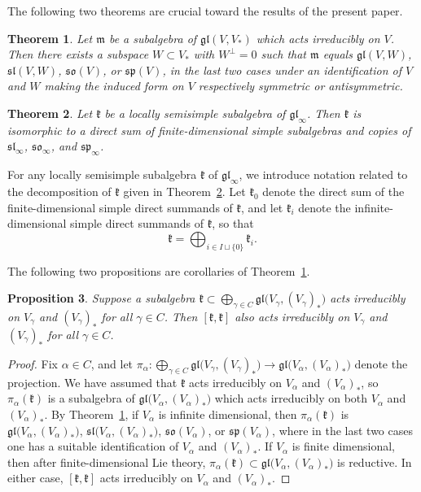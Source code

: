 \documentclass{article}
\def\gl{\mathfrak {gl}}
\def\m{\mathfrak {m}}
\def\sl{\mathfrak{sl}}
\def\so{\mathfrak{so}}
\def\sp{\mathfrak{sp}}
\def\k{\mathfrak{k}}
\newtheorem{thm}{Theorem}[section]
\newtheorem{prop}[thm]{Proposition}
\begin{document}
The following two theorems are crucial toward the results of the present paper. 


\begin{thm} \cite[Theorem 1.3]{BS} \label{irreducible}
Let $\m$ be a subalgebra of $\gl(V,V_*)$ which acts irreducibly on $V$.  Then there exists a subspace $W \subset V_*$ with $W^\perp = 0$ such that $\m$ equals $\gl(V,W)$, $\sl(V,W)$,
$\so(V)$, or $\sp(V)$, in the last two cases under an identification of $V$ and $W$ making the induced form on $V$ respectively symmetric or antisymmetric.
\end{thm}


\begin{thm} \cite{DP4} \label{locsemisimple} 
Let $\k$ be a locally semisimple subalgebra of $\gl_\infty$. 
Then $\k$ is isomorphic to a direct sum of finite-dimensional simple subalgebras and copies of $\sl_\infty$, $\so_\infty$, and $\sp_\infty$.
\end{thm}


For any locally semisimple subalgebra $\k$ of $\gl_\infty$, we introduce notation related to the decomposition of $\k$ given in Theorem~\ref{locsemisimple}.  Let $\k_0$ denote the direct sum of the finite-dimensional simple direct summands of $\k$, and let $\k_i$ denote the infinite-dimensional simple direct summands of $\k$, so that 
\begin{equation} \label{locssdecomp}
\k =  \bigoplus_{i \in I \sqcup \{0 \}} \k_i. 
\end{equation} 

The following two propositions are corollaries of Theorem~\ref{irreducible}. 


\begin{prop}\label{glirreducibleeverywhere}
Suppose a subalgebra $\k \subset \bigoplus_{\gamma \in C} \gl \big(V_\gamma , (V_\gamma)_* \big)$ acts irreducibly on $V_\gamma$ and $(V_\gamma)_*$ for all $\gamma \in C$.  Then $[\k,\k]$ also acts irreducibly on $V_\gamma$ and $(V_\gamma)_*$ for all $\gamma \in C$.  
\end{prop}

\begin{proof}
Fix $\alpha \in C$, and let $\pi_\alpha \colon  \bigoplus_{\gamma \in C} \gl \big( V_\gamma , (V_\gamma)_* \big) \rightarrow  \gl \big(V_\alpha , (V_\alpha)_* \big)$ denote the projection.  We have assumed that $\k$ acts irreducibly on $V_\alpha$ and $(V_\alpha)_*$, so $\pi_\alpha (\k)$ is a subalgebra of $\gl \big( V_\alpha, (V_\alpha)_* \big)$ which acts irreducibly on both $V_\alpha$ and $(V_\alpha)_*$.  By Theorem~\ref{irreducible}, if $V_\alpha$ is infinite dimensional, then $\pi_\alpha (\k)$ is $\gl \big( V_\alpha,(V_\alpha)_* \big)$, $\sl \big( V_\alpha,(V_\alpha)_* \big)$, $\so(V_\alpha)$, or $\sp(V_\alpha)$, where in the last two cases one has a suitable identification of $V_\alpha$ and $(V_\alpha)_*$.  If $V_\alpha$ is finite dimensional, then after finite-dimensional Lie theory, $\pi_\alpha (\k) \subset \gl \big( V_\alpha , (V_\alpha)_* \big)$ is reductive.  In either case, $[\k,\k]$ acts irreducibly on $V_\alpha$ and $(V_\alpha)_*$. 
\end{proof}
\end{document}
